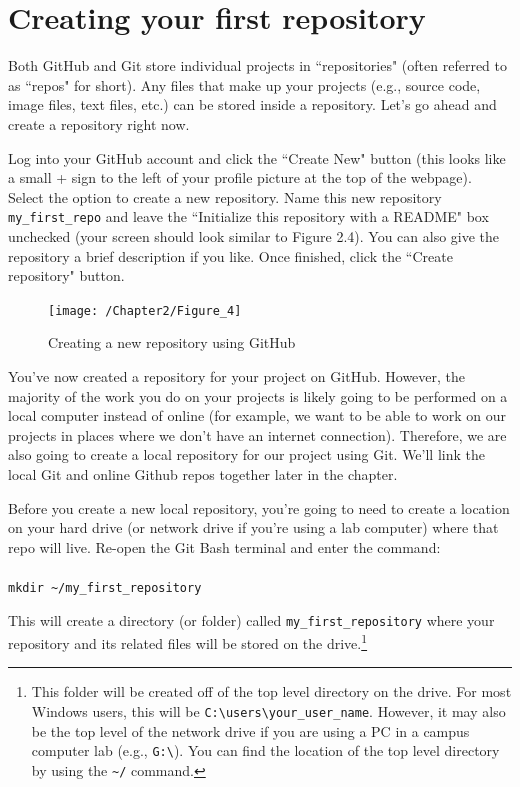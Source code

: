\documentclass{book}
\begin{document}
\section{Creating your first repository}

Both GitHub and Git store individual projects in ``repositories" (often referred to as ``repos" for short). Any files that make up your projects (e.g., source code, image files, text files, etc.) can be stored inside a repository. Let's go ahead and create a repository right now. 

Log into your GitHub account and click the ``Create New" button (this looks like a small + sign to the left of your profile picture at the top of the webpage). Select the option to create a new repository. Name this new repository \texttt{my\_first\_repo} and leave the ``Initialize this repository with a README" box unchecked (your screen should look similar to Figure 2.4). You can also give the repository a brief description if you like. Once finished, click the ``Create repository" button. 

\begin{figure}[h]
	\caption{Creating a new repository using GitHub}
	\centering\texttt{[image: /Chapter2/Figure\_4]}
\end{figure}

You've now created a repository for your project on GitHub. However, the majority of the work you do on your projects is likely going to be performed on a local computer instead of online (for example, we want to be able to work on our projects in places where we don't have an internet connection). Therefore, we are also going to create a local repository for our project using Git. We'll link the local Git and online Github repos together later in the chapter.

Before you create a new local repository, you're going to need to create a location on your hard drive (or network drive if you're using a lab computer) where that repo will live. Re-open the Git Bash terminal and enter the command: \\ \\ \texttt{mkdir \textasciitilde/my\_first\_repository}
 
This will create a directory (or folder) called \texttt{my\_first\_repository} where your repository and its related files will be stored on the drive.\footnote{This folder will be created off of the top level directory on the drive. For most Windows users, this will be \texttt{C:\textbackslash users\textbackslash your\_user\_name}. However, it may also be the top level of the network drive if you are using a PC in a campus computer lab (e.g., \texttt{G:\textbackslash}). You can find the location of the top level directory by using the \texttt{\textasciitilde/} command.}
\end{document}

